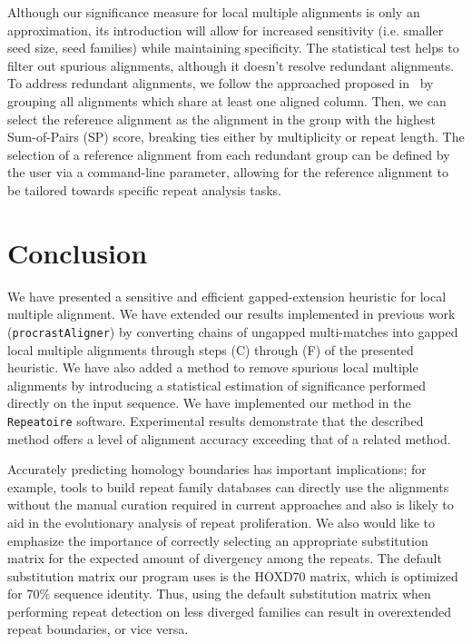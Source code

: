 \documentclass[12pt,journal,draftcls,letterpaper,onecolumn]{IEEEtran}
\begin{document}

Although our significance measure for local multiple alignments is only an approximation, its introduction will allow
for increased sensitivity (i.e. smaller seed size, seed families) while maintaining specificity. The statistical
test helps to filter out spurious alignments, although it doesn't resolve redundant alignments. To address redundant alignments, we follow
the approached proposed in~\cite{ref-related1} by grouping all alignments which share at least one aligned column. Then, we can select the reference alignment
as the alignment in the group with the highest Sum-of-Pairs (SP) score, breaking ties either by multiplicity or repeat length. The selection of a reference alignment from each redundant group can be defined by the user via a command-line parameter, allowing for the reference alignment to be tailored towards specific repeat analysis tasks.



\section{Conclusion}
We have presented a sensitive and efficient gapped-extension heuristic for local
multiple alignment. We have extended our results implemented in previous work (\texttt{procrastAligner}) by
converting chains of ungapped multi-matches into gapped local multiple
alignments through steps (C) through (F) of the presented heuristic. We have also added a method to remove spurious local multiple alignments by introducing a statistical estimation of significance
performed directly on the input sequence. We have implemented our method in the \texttt{Repeatoire} software. Experimental results demonstrate that the
described method offers a level of alignment accuracy exceeding
that of a related method. 

Accurately predicting homology boundaries has important implications; for example, tools to build repeat family databases can directly use the alignments without the manual curation required in current approaches and also is likely to aid in the evolutionary analysis of repeat proliferation.  We also would like to emphasize the importance of correctly selecting an appropriate substitution matrix for the expected amount of divergency among the repeats. The default substitution matrix our program uses is the HOXD70 matrix, which is optimized for 70\% sequence identity. Thus, using the default substitution matrix when performing repeat detection on less diverged families can result in overextended repeat boundaries, or vice versa.
\end{document}
